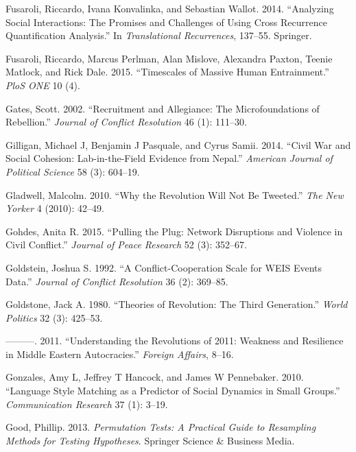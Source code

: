 \documentclass[english,man]{apa6}
\begin{document}
\leavevmode\hypertarget{ref-fusaroli2014analyzing}{}%
Fusaroli, Riccardo, Ivana Konvalinka, and Sebastian Wallot. 2014. ``Analyzing Social Interactions: The Promises and Challenges of Using Cross Recurrence Quantification Analysis.'' In \emph{Translational Recurrences}, 137--55. Springer.

\leavevmode\hypertarget{ref-fusaroli2015timescales}{}%
Fusaroli, Riccardo, Marcus Perlman, Alan Mislove, Alexandra Paxton, Teenie Matlock, and Rick Dale. 2015. ``Timescales of Massive Human Entrainment.'' \emph{PloS ONE} 10 (4).

\leavevmode\hypertarget{ref-gates2002recruitment}{}%
Gates, Scott. 2002. ``Recruitment and Allegiance: The Microfoundations of Rebellion.'' \emph{Journal of Conflict Resolution} 46 (1): 111--30.

\leavevmode\hypertarget{ref-gilligan2014civil}{}%
Gilligan, Michael J, Benjamin J Pasquale, and Cyrus Samii. 2014. ``Civil War and Social Cohesion: Lab-in-the-Field Evidence from Nepal.'' \emph{American Journal of Political Science} 58 (3): 604--19.

\leavevmode\hypertarget{ref-gladwell2010revolution}{}%
Gladwell, Malcolm. 2010. ``Why the Revolution Will Not Be Tweeted.'' \emph{The New Yorker} 4 (2010): 42--49.

\leavevmode\hypertarget{ref-gohdes2015pulling}{}%
Gohdes, Anita R. 2015. ``Pulling the Plug: Network Disruptions and Violence in Civil Conflict.'' \emph{Journal of Peace Research} 52 (3): 352--67.

\leavevmode\hypertarget{ref-goldstein1992conflict}{}%
Goldstein, Joshua S. 1992. ``A Conflict-Cooperation Scale for WEIS Events Data.'' \emph{Journal of Conflict Resolution} 36 (2): 369--85.

\leavevmode\hypertarget{ref-goldstone1980theories}{}%
Goldstone, Jack A. 1980. ``Theories of Revolution: The Third Generation.'' \emph{World Politics} 32 (3): 425--53.

\leavevmode\hypertarget{ref-goldstone2011understanding}{}%
---------. 2011. ``Understanding the Revolutions of 2011: Weakness and Resilience in Middle Eastern Autocracies.'' \emph{Foreign Affairs}, 8--16.

\leavevmode\hypertarget{ref-gonzales2010language}{}%
Gonzales, Amy L, Jeffrey T Hancock, and James W Pennebaker. 2010. ``Language Style Matching as a Predictor of Social Dynamics in Small Groups.'' \emph{Communication Research} 37 (1): 3--19.

\leavevmode\hypertarget{ref-good2013permutation}{}%
Good, Phillip. 2013. \emph{Permutation Tests: A Practical Guide to Resampling Methods for Testing Hypotheses}. Springer Science \& Business Media.
\end{document}
